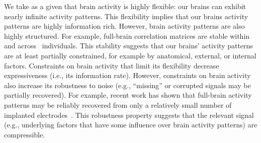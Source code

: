 \documentclass[english, 11pt]{article}
\begin{document}
We take as a given that brain activity is highly flexible: our brains can
exhibit nearly infinite activity patterns. This flexibility implies that our
brains activity patterns are highly information rich. However, brain activity
patterns are also highly structured. For example, full-brain correlation
matrices are stable within~\citep{FinnEtal15, FinnEtal17, GratEtal18} and
across~\citep{YeoEtal11, GlerEtal12, GratEtal18, ColeEtal14} individuals. This
stability suggests that our brains' activity patterns are at least partially
constrained, for example by anatomical, external, or internal factors.
Constraints on brain activity that limit its flexibility decrease
expressiveness (i.e., its information rate). However, constraints on brain
activity also increase its robustness to noise (e.g., ``missing'' or corrupted
signals may be partially recovered). For example, recent work has shown that
full-brain activity patterns may be reliably recovered from only a relatively
small number of implanted electrodes~\citep{OwenEtal20, ScanEtal21}. This
robustness property suggests that the relevant signal (e.g., underlying factors
that have some influence over brain activity patterns) are compressible.
\end{document}
